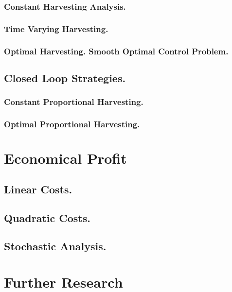 \documentclass[twoside,colorback,accentcolor=tud4c,11pt]{tudreport}
\begin{document}
		\subsection{Constant Harvesting Analysis.}
		
		\subsection{Time Varying Harvesting.}
		
		\subsection{Optimal Harvesting. Smooth Optimal Control Problem.}
		
	\section{Closed Loop Strategies.}
		\graphicspath{{FishingStrategies/ClosedLoop/}}
		
		\subsection{Constant Proportional Harvesting.}
		
		\subsection{Optimal Proportional Harvesting.}
		
\chapter{Economical Profit}\label{chap: Economical Profit}
	
	\section{Linear Costs.}
	
	\section{Quadratic Costs.}
	
	\section{Stochastic Analysis.}
	
\chapter{Further Research}\label{chap: Further Enhancements}
\end{document}
